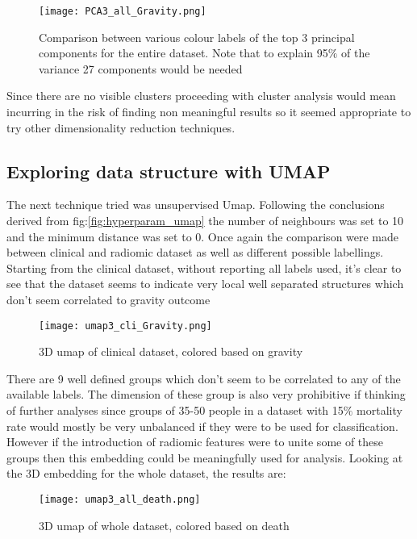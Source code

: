 \begin{figure}[h!]
  		\texttt{[image: PCA3\_all\_Gravity.png]}\label{PCA3_all_gravity}
          \caption{Comparison between various colour labels of the top 3 principal components for the entire dataset. Note that to explain 95$\%$ of the variance 27 components would be needed}
\end{figure}

Since there are no visible clusters proceeding with cluster analysis would mean incurring in the risk of finding non meaningful results so it seemed appropriate to try other dimensionality reduction techniques.

\subsection{Exploring data structure with UMAP}
The next technique tried was unsupervised Umap. Following the conclusions derived from fig:\ref{fig:hyperparam_umap} the number of neighbours was set to 10 and the minimum distance was set to 0.
Once again the comparison were made between clinical and radiomic dataset as well as different possible labellings. 
Starting from the clinical dataset, without reporting all labels used, it's clear to see that the dataset seems to indicate very local well separated structures which don't seem correlated to gravity outcome

\begin{figure}[htbp]
  		\texttt{[image: umap3\_cli\_Gravity.png]}\label{umap3_cli_gravity}
          \caption{3D umap of clinical dataset, colored based on gravity}
\end{figure}

There are 9 well defined groups which don't seem to be correlated to any of the available labels. 
The dimension of these group is also very prohibitive if thinking of further analyses since groups of 35-50 people in a dataset with 15$\%$ mortality rate would mostly be very unbalanced if they were to be used for classification.
However if the introduction of radiomic features were to unite some of these groups then this embedding could be meaningfully used for analysis. 
Looking at the 3D embedding for the whole dataset, the results are:

\begin{figure}[htbp]
  		\texttt{[image: umap3\_all\_death.png]}\label{umap3_all_death}
          \caption{3D umap of whole dataset, colored based on death}
\end{figure}

